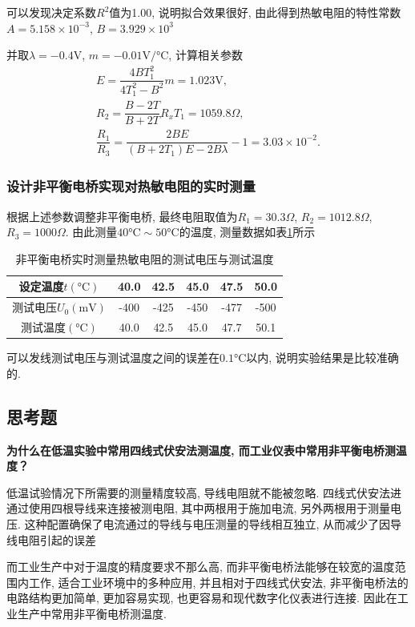 \documentclass[zihao=5, UTF8]{article}
\theoremstyle{MyLineTheoremStyle} %
\theoremstyle{MyBlockTheoremStyle} %
\theoremstyle{MySubsubsectionStyle} %
\begin{document}
可以发现决定系数$R^2$值为1.00, 说明拟合效果很好, 
由此得到热敏电阻的特性常数$A = 5.158 \times 10^{-3}$, $B = 3.929 \times 10^3$

并取$\lambda = -0.4\mathrm{V}$, $m = -0.01\si{\volt \per \celsius}$, 计算相关参数
\begin{gather}
    E = \dfrac{4 B T_1^2}{4 T_1^2 - B^2} m = 1.023\text{V},\\
    R_2 = \dfrac{B - 2T}{B + 2T} R_x T_1 = 1059.8\Omega,\\
    \dfrac{R_1}{R_3} = \dfrac{2 B E}{(B + 2 T_1) E - 2 B \lambda} - 1 = 3.03 \times 10^{-2}.
\end{gather}

\subsubsection{设计非平衡电桥实现对热敏电阻的实时测量}
根据上述参数调整非平衡电桥, 最终电阻取值为$R_1 = 30.3 \Omega$, $R_2 = 1012.8 \Omega$, $R_3 = 1000 \Omega$.
由此测量$40\si{\celsius} \sim 50\si{\celsius}$的温度, 测量数据如表\ref{tab:thermistor-bridge}所示

\begin{table}[H]
\centering
\begin{tabular}{|c|c|c|c|c|c|} 
\hline
设定温度$t(\si{\celsius})$& 40.0 & 42.5 & 45.0 & 47.5 & 50.0  \\ 
\hline
测试电压$U_0(\si{\milli\volt})$ & -400 & -425 & -450 & -477 & -500  \\ 
\hline
测试温度$(\si{\celsius})$ & 40.0 & 42.5 & 45.0 & 47.7 & 50.1  \\
\hline
\end{tabular}
\caption{非平衡电桥实时测量热敏电阻的测试电压与测试温度}
\label{tab:thermistor-bridge}
\end{table}

可以发线测试电压与测试温度之间的误差在$0.1\si{\celsius}$以内, 说明实验结果是比较准确的.
\subsection{思考题}
\textbf{为什么在低温实验中常用四线式伏安法测温度, 而工业仪表中常用非平衡电桥测温度？}

低温试验情况下所需要的测量精度较高, 导线电阻就不能被忽略. 四线式伏安法进
通过使用四根导线来连接被测电阻, 其中两根用于施加电流, 另外两根用于测量电压.
这种配置确保了电流通过的导线与电压测量的导线相互独立, 从而减少了因导线电阻引起的误差

而工业生产中对于温度的精度要求不那么高, 而非平衡电桥法能够在较宽的温度范围内工作, 适合工业环境中的多种应用,
并且相对于四线式伏安法, 非平衡电桥法的电路结构更加简单, 更加容易实现, 也更容易和现代数字化仪表进行连接.
因此在工业生产中常用非平衡电桥测温度.
\end{document}
